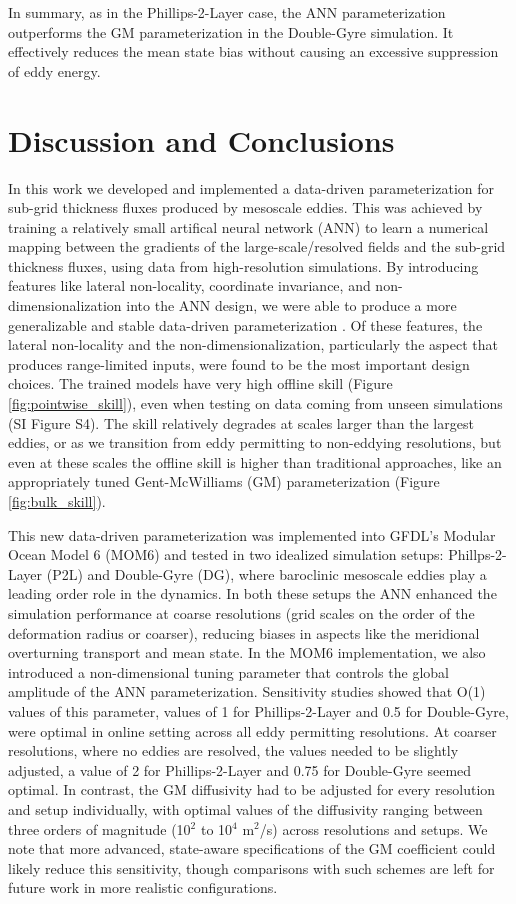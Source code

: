 \documentclass[draft]{agujournal2019}
\begin{document}
In summary, as in the Phillips-2-Layer case, the ANN parameterization outperforms the GM parameterization in the Double-Gyre simulation. It effectively reduces the mean state bias without causing an excessive suppression of eddy energy.


\section{Discussion and Conclusions}
In this work we developed and implemented a data-driven parameterization for sub-grid thickness fluxes produced by mesoscale eddies. This was achieved by training a relatively small artifical neural network (ANN) to learn a numerical mapping between the gradients of the large-scale/resolved fields and the sub-grid thickness fluxes, using data from high-resolution simulations. By introducing features like lateral non-locality, coordinate invariance, and non-dimensionalization into the ANN design, we were able to produce a more generalizable and stable data-driven parameterization \cite<similar to>[]{perezhogin2025generalizable}. 
Of these features, the lateral non-locality and the non-dimensionalization, particularly the aspect that produces range-limited inputs, were found to be the most important design choices.
The trained models have very high offline skill (Figure \ref{fig:pointwise_skill}), even when testing on data coming from unseen simulations (SI Figure S4). The skill relatively degrades at scales larger than the largest eddies, or as we transition from eddy permitting to non-eddying resolutions, but even at these scales the offline skill is  higher than traditional approaches, like an appropriately tuned Gent-McWilliams (GM) parameterization (Figure \ref{fig:bulk_skill}).

This new data-driven parameterization was implemented into GFDL's Modular Ocean Model 6 (MOM6) and tested in two idealized simulation setups: Phillps-2-Layer (P2L) and Double-Gyre (DG), where baroclinic mesoscale eddies play a leading order role in the dynamics. In both these setups the ANN enhanced the simulation performance at coarse resolutions (grid scales on the order of the deformation radius or coarser), reducing biases in aspects like the meridional overturning transport and mean state. In the MOM6 implementation, we also introduced a non-dimensional tuning parameter that controls the global amplitude of the ANN parameterization. Sensitivity studies showed that O(1) values of this parameter, values of 1 for Phillips-2-Layer and 0.5 for Double-Gyre, were optimal in online setting across all eddy permitting resolutions. At coarser resolutions, where no eddies are resolved, the values needed to be slightly adjusted, a value of 2 for Phillips-2-Layer and 0.75 for Double-Gyre seemed optimal. In contrast, the GM diffusivity had to be adjusted for every resolution and setup individually, with optimal values of the diffusivity ranging between three orders of magnitude (10$^2$ to 10$^4$ m$^2$/s) across resolutions and setups.  We note that more advanced, state-aware specifications of the GM coefficient \cite{jansen2019toward, mak2018implementation} could likely reduce this sensitivity, though comparisons with such schemes are left for future work in more realistic configurations.
\end{document}
